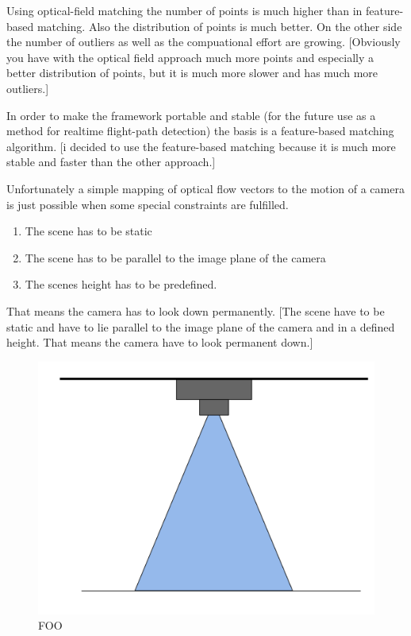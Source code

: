 \documentclass[11pt]{article}
\begin{document}
	Using optical-field matching the number of points is much higher than in feature-based matching. Also the distribution of points is much better. On the other side the number of outliers as well as the compuational effort are growing.
	[Obviously you have with the optical field approach much more points and especially a better distribution of points, but it is much more slower and has much more outliers.]

	In order to make the framework portable and stable (for the future use as a method for realtime flight-path detection) the basis is a feature-based matching algorithm.
	[i decided to use the feature-based matching because it is much more stable and faster than the other approach.]

	Unfortunately a simple mapping of optical flow vectors to the motion of a camera is just possible when some special constraints are fulfilled.
	\begin{enumerate}
	  \item The scene has to be static
	  \item The scene has to be parallel to the image plane of the camera
	  \item The scenes height has to be predefined.
	\end{enumerate}
	
	That means the camera has to look down permanently.
	[The scene have to be static and have to lie parallel to the image plane of the camera and in a defined height. That means the camera have to look permanent down.]

	\begin{figure}[H]
		\centering
		\includegraphics[width=\textwidth]{images/look_down.png}
		\caption{FOO}
		\label{fig:BAR}
	\end{figure}
\end{document}
